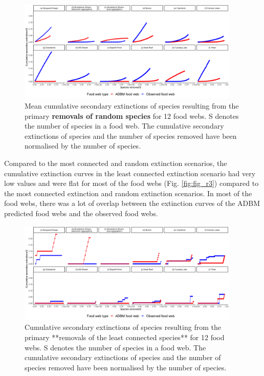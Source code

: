 \documentclass{article}
\begin{document}
\begin{figure}

{\centering \includegraphics[width=400px]{../results/plot_random} 

}

\caption{\label{fig:fig_r2} Mean cumulative secondary extinctions of species resulting from the primary \textbf{removals of random species} for 12 food webs. S denotes the number of species in a food web. The cumulative secondary extinctions of species and the number of species removed have been normalised by the number of species.}\label{fig:unnamed-chunk-3}
\end{figure}

Compared to the most connected and random extinction scenarios, the
cumulative extinction curves in the least connected extinction scenario
had very low values and were flat for most of the food webs (Fig.
\ref{fig:fig_r3}) compared to the most connected extinction and random
extinction scenarios. In most of the food webs, there was a lot of
overlap between the extinction curves of the ADBM predicted food webs
and the observed food webs.

\begin{figure}

{\centering \includegraphics[width=400px]{../results/plot_leastconnected} 

}

\caption{\label{fig:fig_r3} Cumulative secondary extinctions of species resulting from the primary **removals of the least connected species** for 12 food webs. S denotes the number of species in a food web. The cumulative secondary extinctions of species and the number of species removed have been normalised by the number of species.}\label{fig:unnamed-chunk-4}
\end{figure}
\end{document}
